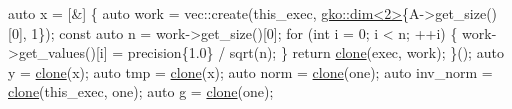 \begin{DoxyCodeInclude}
    \textcolor{keyword}{auto} x = [&] \{
        \textcolor{keyword}{auto} work = vec::create(this\_exec, \hyperlink{structgko_1_1dim}{gko::dim<2>}\{A->get\_size()[0], 1\});
        \textcolor{keyword}{const} \textcolor{keyword}{auto} n = work->get\_size()[0];
        \textcolor{keywordflow}{for} (\textcolor{keywordtype}{int} i = 0; i < n; ++i) \{
            work->get\_values()[i] = precision\{1.0\} / sqrt(n);
        \}
        \textcolor{keywordflow}{return} \hyperlink{namespacegko_a1beb80750459e4201aa9d882d2d074c3}{clone}(exec, work);
    \}();
    \textcolor{keyword}{auto} y = \hyperlink{namespacegko_a1beb80750459e4201aa9d882d2d074c3}{clone}(x);
    \textcolor{keyword}{auto} tmp = \hyperlink{namespacegko_a1beb80750459e4201aa9d882d2d074c3}{clone}(x);
    \textcolor{keyword}{auto} norm = \hyperlink{namespacegko_a1beb80750459e4201aa9d882d2d074c3}{clone}(one);
    \textcolor{keyword}{auto} inv\_norm = \hyperlink{namespacegko_a1beb80750459e4201aa9d882d2d074c3}{clone}(this\_exec, one);
    \textcolor{keyword}{auto} g = \hyperlink{namespacegko_a1beb80750459e4201aa9d882d2d074c3}{clone}(one);


\end{DoxyCodeInclude}
